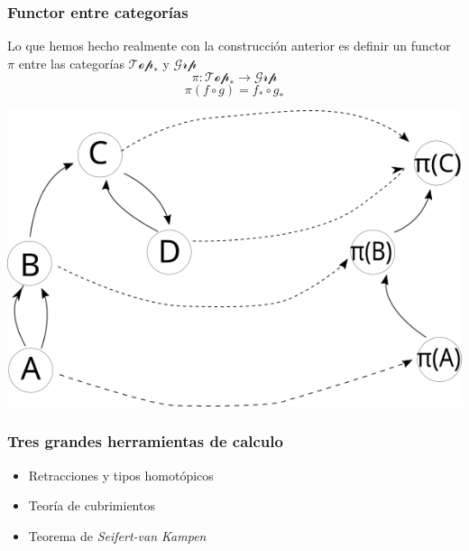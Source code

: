 \documentclass[xetex,mathserif,serif]{beamer}
\newcommand{\vank}{\emph{Seifert-van Kampen} }
\begin{document}
  \begin{frame}
    \frametitle{Functor entre categorías}
    Lo que hemos hecho realmente con la construcción anterior es definir
    un functor \(\pi\) entre las categorías \(\mathscr{Top}_*\) y
    \(\mathscr{Grp}\)
    \[ \pi : \mathscr{Top}_* \to \mathscr{Grp} \]
    \[ \pi (f \circ g) = f_* \circ g_* \]
    \begin{center}
      \includegraphics[scale=0.4]{./imag/categoria.png}
    \end{center}
  \end{frame}
  \begin{frame}
    \frametitle{Tres grandes herramientas de calculo}
    \begin{itemize}
    \item Retracciones y tipos homotópicos
    \item Teoría de cubrimientos
    \item Teorema de \vank
    \end{itemize}
  \end{frame}
\end{document}
